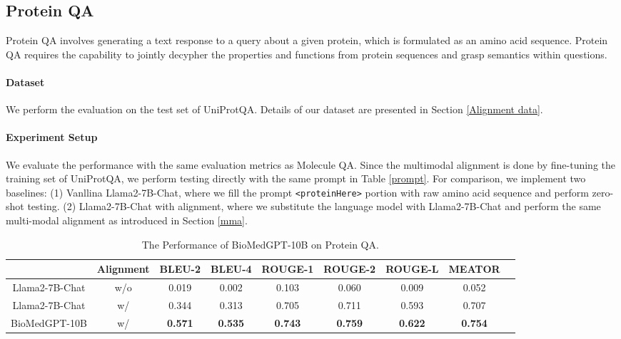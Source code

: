 \documentclass{article}
\begin{document}
\subsection{Protein QA}
Protein QA involves generating a text response to a query about a given protein, which is formulated as an amino acid sequence. Protein QA requires the capability to jointly decypher the properties and  functions from protein sequences and grasp semantics within questions.


\paragraph{Dataset} We perform the evaluation on the test set of UniProtQA. Details of our dataset are presented in Section \ref{Alignment data}.


\paragraph{Experiment Setup} 
We evaluate the performance with the same evaluation metrics as Molecule QA. Since the multimodal alignment is done by fine-tuning the training set of UniProtQA, we perform testing directly with the same prompt in Table \ref{prompt}. For comparison, we implement two baselines: (1) Vanllina Llama2-7B-Chat, where we fill the prompt \texttt{<proteinHere>} portion with raw amino acid sequence and perform zero-shot testing. (2) Llama2-7B-Chat with alignment, where we substitute the language model with Llama2-7B-Chat and perform the same multi-modal alignment as introduced in Section \ref{mma}.
\begin{table}[h]
    \caption{The Performance of BioMedGPT-10B on Protein QA.}
    \small
    \centering
    \begin{tabular}{c|c|ccccccc}
        \toprule
            & Alignment & BLEU-2 & BLEU-4 & ROUGE-1 & ROUGE-2 & ROUGE-L & MEATOR  \\
        \midrule
        Llama2-7B-Chat & w/o  & 0.019 & 0.002 & 0.103 & 0.060 &  0.009 & 0.052 &     \\
        Llama2-7B-Chat & w/  & 0.344 & 0.313 & 0.705 & 0.711 & 0.593 & 0.707 &     \\
        \midrule
        BioMedGPT-10B    & w/ & \bf0.571 & \bf0.535 & \bf0.743 & \bf0.759 & \bf0.622 & \bf0.754 &  \\
        \bottomrule
    \end{tabular}
    \label{P-C}
\end{table}
\end{document}
